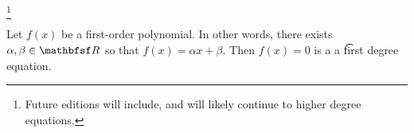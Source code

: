 
\footnote{Future editions will include, and will likely continue to higher degree equations.}


Let $f(x)$ be a first-order polynomial.
In other words, there exists $\alpha, \beta \in \R$ so that $f(x) = \alpha x + \beta$.
Then $f(x) = 0$ is a a \t{first degree equation}.

\blankpage
